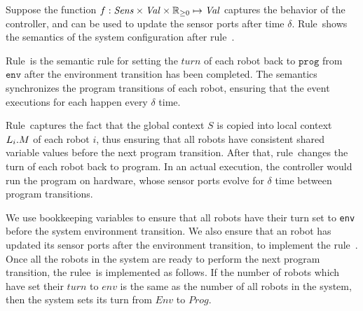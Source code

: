 Suppose the function $f:\mathit{Sens} \times \Val \times \nnreals \mapsto \Val$ captures the behavior of the controller,
and can be used to update the sensor ports after time $\delta$.
Rule~\EnvTransRule shows the semantics of the system configuration after rule~\RunSysRule.

Rule~\RobotEnvToProgRule is the semantic rule for setting the $\mathit{turn}$ of each robot back to $\mathtt{prog}$ from $\mathtt{env}$ after the environment transition has been completed. The semantics synchronizes the program transitions of each robot, ensuring that the event executions for each happen every $\delta$ time.


Rule~\EnvTransRule captures the fact that the global context $S$ is copied into local context $L_{i}.M$ of each robot $i$,
thus ensuring that all robots have consistent shared variable values before the next program transition.
After that, rule~\EnvToProgRule changes the turn of each robot back to program.
In an actual execution, the controller would run the program on hardware,
whose sensor ports evolve for $\delta$ time between program transitions.

%
%

We use bookkeeping variables to ensure that all robots have their turn set to \texttt{env} before the system environment transition.
We also ensure that an robot has updated its sensor ports after the environment transition,
to implement the rule~\RobotEnvToProgRule.
Once all the robots in the system are ready to perform the next program transition,
the rulee~\EnvToProgRule is implemented as follows.
If the number of robots which have set their $\mathit{turn}$ to $\mathit{env}$ is the same as the number of all robots in the system,
then the system sets its turn from $\mathit{Env}$ to $\mathit{Prog}$.


